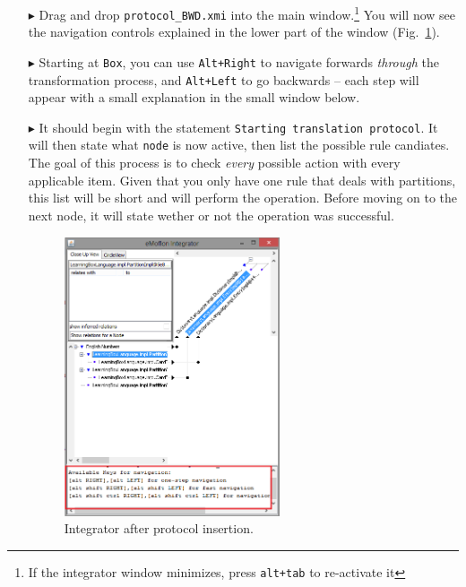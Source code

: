\begin{itemize}
\item[$\blacktriangleright$] Drag and drop \texttt{protocol\_BWD.xmi} into the main window.\footnote{If the integrator window minimizes, press \texttt{alt+tab}
to re-activate it} You will now see the navigation controls explained in the lower part of the window (Fig.~\ref{fig:integrator_after_protocol}).

\vspace{0.5cm}

\item[$\blacktriangleright$]  Starting at \texttt{Box}, you can use \texttt{Alt+Right} to navigate forwards \emph{through} the transformation process, and
\texttt{Alt+Left} to go backwards -- each step will appear with a small explanation in the small window below.

\item[$\blacktriangleright$] It should begin with the statement \texttt{Starting translation protocol}. It will then state what \texttt{node} is now active,
then list the possible rule candiates. The goal of this process is to check \emph{every} possible action with every applicable item. Given that you only have
one rule that deals with partitions, this list will be short and will perform the operation. Before moving on to the next node, it will state wether or not the
operation was successful.

\newpage

\begin{figure}[h!]
\begin{center}
  \includegraphics[width=0.6\textwidth]{integrator_after_protocol_insertion.png}
  \caption{Integrator after protocol insertion.}
  \label{fig:integrator_after_protocol}
\end{center}
\end{figure} 


\end{itemize}
